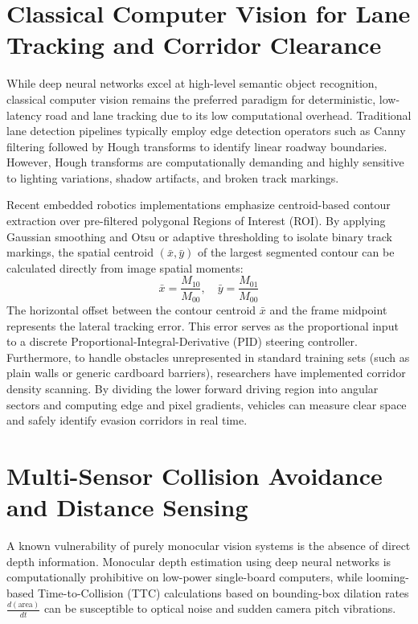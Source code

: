 \section{Classical Computer Vision for Lane Tracking and Corridor Clearance}
While deep neural networks excel at high-level semantic object recognition, classical computer vision remains the preferred paradigm for deterministic, low-latency road and lane tracking due to its low computational overhead. Traditional lane detection pipelines typically employ edge detection operators such as Canny filtering followed by Hough transforms to identify linear roadway boundaries. However, Hough transforms are computationally demanding and highly sensitive to lighting variations, shadow artifacts, and broken track markings.

Recent embedded robotics implementations emphasize centroid-based contour extraction over pre-filtered polygonal Regions of Interest (ROI). By applying Gaussian smoothing and Otsu or adaptive thresholding to isolate binary track markings, the spatial centroid $(\bar{x}, \bar{y})$ of the largest segmented contour can be calculated directly from image spatial moments:
\begin{equation}
\bar{x} = \frac{M_{10}}{M_{00}}, \quad \bar{y} = \frac{M_{01}}{M_{00}}
\end{equation}
The horizontal offset between the contour centroid $\bar{x}$ and the frame midpoint represents the lateral tracking error. This error serves as the proportional input to a discrete Proportional-Integral-Derivative (PID) steering controller. Furthermore, to handle obstacles unrepresented in standard training sets (such as plain walls or generic cardboard barriers), researchers have implemented corridor density scanning. By dividing the lower forward driving region into angular sectors and computing edge and pixel gradients, vehicles can measure clear space and safely identify evasion corridors in real time.

\section{Multi-Sensor Collision Avoidance and Distance Sensing}
A known vulnerability of purely monocular vision systems is the absence of direct depth information. Monocular depth estimation using deep neural networks is computationally prohibitive on low-power single-board computers, while looming-based Time-to-Collision (TTC) calculations based on bounding-box dilation rates $\frac{d(\text{area})}{dt}$ can be susceptible to optical noise and sudden camera pitch vibrations.

